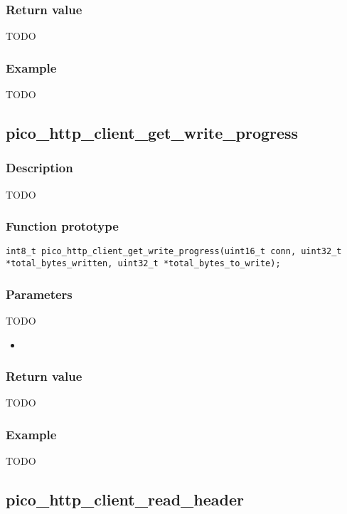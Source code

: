 \subsubsection*{Return value}
TODO
\subsubsection*{Example}
TODO


\subsection{pico\_http\_client\_get\_write\_progress}

\subsubsection*{Description}
TODO

\subsubsection*{Function prototype}
\texttt{int8\_t pico\_http\_client\_get\_write\_progress(uint16\_t conn, uint32\_t *total\_bytes\_written, uint32\_t *total\_bytes\_to\_write);}

\subsubsection*{Parameters}
TODO
\begin{itemize}[noitemsep]
\item \texttt{}
\end{itemize}
\subsubsection*{Return value}
TODO
\subsubsection*{Example}
TODO


\subsection{pico\_http\_client\_read\_header}

